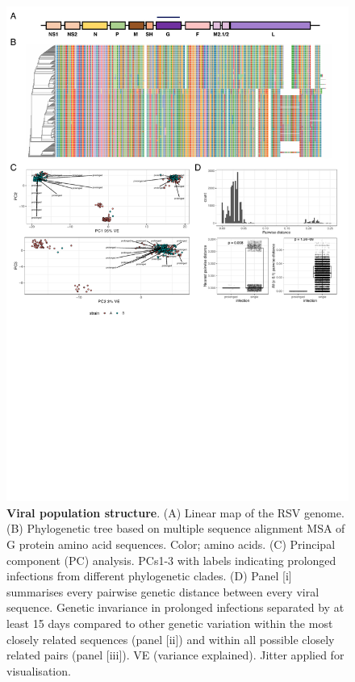 \documentclass{article} %
\begin{document}
\begin{figure}[ht] \hspace{-0.5cm} 
    \includegraphics[scale=0.8]{f2}
	\caption{\textbf{Viral population structure}.
 (A) Linear map of the RSV genome. (B) Phylogenetic tree based on multiple sequence alignment MSA of G protein amino acid sequences. Color; amino acids. (C) Principal component (PC) analysis. PCs1-3 with labels indicating prolonged infections from different phylogenetic clades. (D) Panel [i] summarises every pairwise genetic distance between every viral sequence. Genetic invariance in prolonged infections separated by at least 15 days compared to other genetic variation within the most closely related sequences (panel [ii]) and within all possible closely related pairs (panel [iii]). VE (variance explained). Jitter applied for visualisation.}
	\label{fig:2} 
\end{figure}
\clearpage
\end{document}
